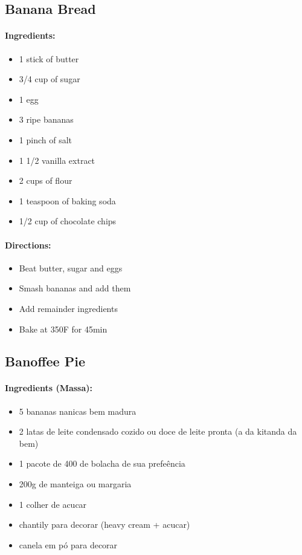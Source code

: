 \documentclass{article}
\begin{document}


\subsection{Banana Bread}

\paragraph{Ingredients:}

\begin{itemize}
	\item 1 stick of butter
	\item 3/4 cup of sugar
	\item 1 egg
	\item 3 ripe bananas
	\item 1 pinch of salt
	\item 1 1/2 vanilla extract
	\item 2 cups of flour
	\item 1 teaspoon of baking soda
	\item 1/2 cup of chocolate chips
\end{itemize}

\paragraph{Directions:}
\begin{itemize}
	\item Beat butter, sugar and eggs
	\item Smash bananas and add them
	\item Add remainder ingredients
	\item Bake at 350F for 45min
\end{itemize}


\subsection{Banoffee Pie}

\paragraph{Ingredients (Massa):}
\begin{itemize}
	\item 5 bananas nanicas bem madura
	\item 2 latas de leite condensado cozido ou doce de leite pronta (a da kitanda da bem)
	\item 1 pacote de 400 de bolacha de sua prefeência
	\item 200g de manteiga ou margaria
	\item 1 colher de acucar
	\item chantily para decorar (heavy cream + acucar)
	\item canela em pó para decorar
\end{itemize}
\end{document}
